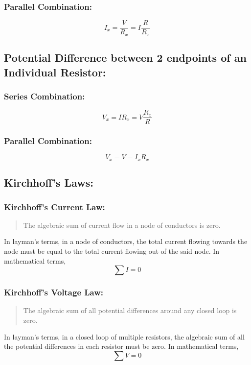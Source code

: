 \documentclass[a4paper]{report}
\begin{document}
            \subsubsection{Parallel Combination:}
                \begin{equation}
                    I_x = \frac{V}{R_x} = I \frac{R}{R_x}
                \end{equation}
        \subsection{Potential Difference between 2 endpoints of an Individual Resistor:}
            \subsubsection{Series Combination:}
                \begin{equation}
                    V_x = IR_x = V \frac{R_x}{R}
                \end{equation}
            \subsubsection{Parallel Combination:}
                \begin{equation}
                    V_x = V = I_x R_x
                \end{equation}
        \subsection{Kirchhoff's Laws:}
            \subsubsection{Kirchhoff's Current Law:}
                \begin{quotation}
                    The algebraic sum of current flow in a node of conductors is zero.
                \end{quotation}
                In layman's terms, in a node of conductors, the total current flowing towards the node must be equal to the total current flowing out of the said node. In mathematical terms,
                \begin{equation}
                    \sum I = 0
                \end{equation}
            \subsubsection{Kirchhoff's Voltage Law:}
                \begin{quotation}
                    The algebraic sum of all potential differences around any closed loop is zero.
                \end{quotation}
                In layman's terms, in a closed loop of multiple resistors, the algebraic sum of all the potential differences in each resistor must be zero. In mathematical terms,
                \begin{equation}
                    \sum V = 0
                \end{equation}
\end{document}
